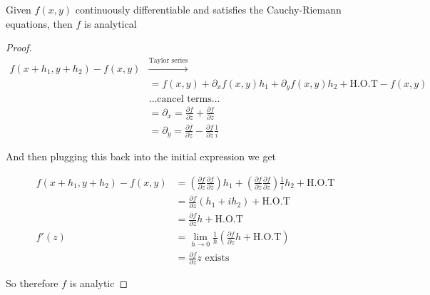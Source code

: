 \documentclass[../notes.tex]{subfiles}
\begin{document}
\begin{theorem}

	Given $ f(x,y) $ continuously differentiable and satisfies the Cauchy-Riemann equations, then $ f $ is analytical

	\begin{proof}
		\begin{equation}
			\begin{split}
				f(x+h_1, y+h_2) - f(x,y) &\xrightarrow{\text{Taylor series}}  \\
				 &= f(x,y) + \partial_x f(x, y) h_1 + \partial_y f(x, y) h_2 + \text{H.O.T} - f(x, y) \\
				 & \ldots \text{cancel terms} \ldots \\
				 &= \partial_x = \frac{\partial f}{\partial z} + \frac{\partial f}{\partial \overline{z}} \\
				 &= \partial_y = \frac{\partial f}{\partial \overline{z}} - \frac{\partial f}{\partial z} \frac{1}{i}
			\end{split}
		\end{equation}


		And then plugging this back into the initial expression we get

		\begin{equation}
			\begin{split}
				f(x+h_1, y+h_2) - f(x,y) &=
				(\frac{\partial f}{\partial z} \frac{\partial f}{\partial \overline{z}}) h_1 + 
				(\frac{\partial f}{\partial \overline{z}} \frac{\partial f}{\partial z}) \frac{1}{i} h_2
				+ \text{H.O.T} \\
																 &= \frac{\partial f}{\partial z} (h_1  + i h_2) + \text{H.O.T} \\
																 &= \frac{\partial f}{\partial z} h + \text{H.O.T} \\
				f'(z) &= \lim_{h \to 0} \frac{1}{h} (\frac{\partial f}{\partial z} h + \text{H.O.T}) \\
							&=  \frac{\partial f}{\partial z} z \text{   exists}
			\end{split}
		\end{equation}

		So therefore $ f $ is analytic
		
	\end{proof}
	
	
\end{theorem}
\end{document}
